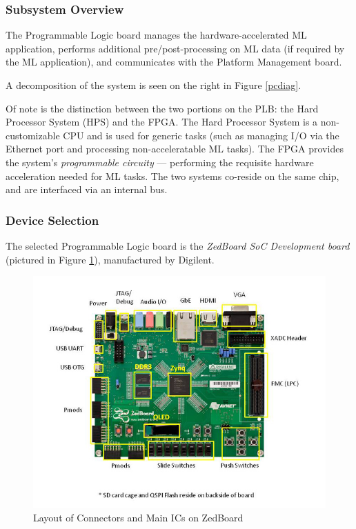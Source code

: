 \subsubsection{Subsystem Overview}
The Programmable Logic board manages the hardware-accelerated ML application, performs additional pre/post-processing on ML data (if required by the ML application), and communicates with the Platform Management board.

A decomposition of the system is seen on the right in Figure \ref{pcdiag}.

Of note is the distinction between the two portions on the PLB: the Hard Processor System (HPS) and the FPGA. The Hard Processor System is a non-customizable CPU and is used for generic tasks (such as managing I/O via the Ethernet port and processing non-acceleratable ML tasks). The FPGA provides the system's \textit{programmable circuity} --- performing the requisite hardware acceleration needed for ML tasks. The two systems co-reside on the same chip, and are interfaced via an internal bus.

\subsubsection{Device Selection}
The selected Programmable Logic board is the \textit{ZedBoard SoC Development board} (pictured in Figure \ref{zedboard}), manufactured by Digilent. 

\begin{figure}\label{zedboard}
\centering
\includegraphics[width=12.5cm]{img/zedboard_functional_overview.jpg}
\caption{Layout of Connectors and Main ICs on ZedBoard}
\end{figure}

